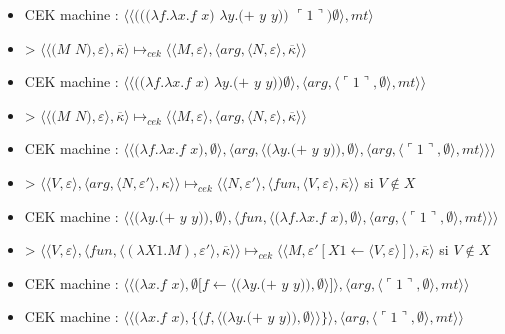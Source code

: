 \documentclass[10pt,a4paper]{article}
\begin{document}
				\begin{itemize}
					\item[] CEK machine : $\langle\langle(((\lambda f.\lambda x.f$ $x)$ $\lambda y.(+$ $y$ $y))$ $\ulcorner 1\urcorner)\emptyset\rangle,mt\rangle$
					\item[] > $\langle\langle(M$ $N),\varepsilon\rangle,\overline{\kappa}\rangle \longmapsto_{cek} \langle \langle M,\varepsilon\rangle,\langle arg,\langle N,\varepsilon\rangle,\overline{\kappa}\rangle\rangle$
					\item[] CEK machine : $\langle\langle((\lambda f.\lambda x.f$ $x)$ $\lambda y.(+$ $y$ $y))\emptyset\rangle,\langle arg,\langle\ulcorner 1\urcorner,\emptyset\rangle,mt\rangle\rangle$
					\item[] > $\langle\langle(M$ $N),\varepsilon\rangle,\overline{\kappa}\rangle \longmapsto_{cek} \langle \langle M,\varepsilon\rangle,\langle arg,\langle N,\varepsilon\rangle,\overline{\kappa}\rangle\rangle$
					\item[] CEK machine : $\langle\langle(\lambda f.\lambda x.f$ $x),\emptyset\rangle,\langle arg,\langle(\lambda y.(+$ $y$ $y)),\emptyset\rangle,\langle arg,\langle\ulcorner 1\urcorner,\emptyset\rangle,mt\rangle\rangle\rangle$
					\item[] >  $\langle \langle V,\varepsilon\rangle,\langle arg,\langle N,\varepsilon'\rangle,\kappa\rangle\rangle \longmapsto_{cek} \langle \langle N,\varepsilon'\rangle,\langle fun,\langle V,\varepsilon\rangle,\overline{\kappa}\rangle\rangle$ si $V \notin X$
					\item[] CEK machine : $\langle\langle(\lambda y.(+$ $y$ $y)),\emptyset\rangle,\langle fun,\langle(\lambda f.\lambda x.f$ $x),\emptyset\rangle,\langle arg,\langle\ulcorner 1\urcorner,\emptyset\rangle,mt\rangle\rangle\rangle$
					\item[] > $\langle\langle V,\varepsilon\rangle,\langle fun,\langle (\lambda X1.M),\varepsilon'\rangle,\overline{\kappa} \rangle \rangle \longmapsto_{cek} \langle \langle M,\varepsilon'[X1 \leftarrow \langle V,\varepsilon\rangle]\rangle,\overline{\kappa}\rangle$ si $V \notin X$
					\item[] CEK machine : $\langle\langle(\lambda x.f$ $x),\emptyset[f \leftarrow \langle(\lambda y.(+$ $y$ $y)),\emptyset\rangle]\rangle,\langle arg,\langle\ulcorner 1\urcorner,\emptyset\rangle,mt\rangle\rangle$
					\item[] CEK machine : $\langle\langle(\lambda x.f$ $x),\{\langle f,\langle(\lambda y.(+$ $y$ $y)),\emptyset\rangle\rangle\}\rangle,\langle arg,\langle\ulcorner 1\urcorner,\emptyset\rangle,mt\rangle\rangle$

\end{itemize}
\end{document}
